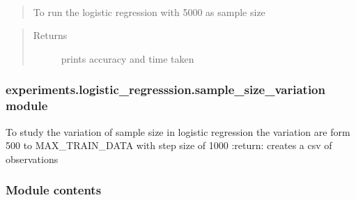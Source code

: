 \documentclass[letterpaper,10pt,english]{sphinxmanual}
\begin{document}
\begin{fulllineitems}
\label{\detokenize{experiments.logistic_regresssion:experiments.logistic_regresssion.run.run}}~\begin{quote}

To run the logistic regression with 5000 as sample size
\end{quote}
\begin{quote}\begin{description}
\item[{Returns}] \leavevmode
prints accuracy and time taken

\end{description}\end{quote}

\end{fulllineitems}



\subsubsection{experiments.logistic\_regresssion.sample\_size\_variation module}
\label{\detokenize{experiments.logistic_regresssion:experiments-logistic-regresssion-sample-size-variation-module}}\label{\detokenize{experiments.logistic_regresssion:module-experiments.logistic_regresssion.sample_size_variation}}

\begin{fulllineitems}
\label{\detokenize{experiments.logistic_regresssion:experiments.logistic_regresssion.sample_size_variation.variate_sample_size}}
To study the variation of sample size in logistic regression
the variation are form 500 to MAX\_TRAIN\_DATA with step size of 1000
:return: creates a csv of observations

\end{fulllineitems}



\subsubsection{Module contents}
\label{\detokenize{experiments.logistic_regresssion:module-experiments.logistic_regresssion}}\label{\detokenize{experiments.logistic_regresssion:module-contents}}
\end{document}
